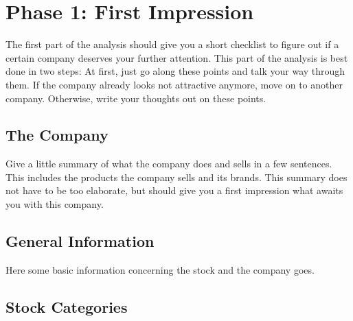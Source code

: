 \section{Phase 1: First Impression}

The first part of the analysis should give you a short checklist to figure out if a certain
company deserves your further attention. This part of the analysis is best done in
two steps: At first, just go along these points and talk your way through them. If the
company already looks not attractive anymore, move on to another company. Otherwise,
write your thoughts out on these points.

\subsection{The Company}

Give a little summary of what the company does and sells in a few sentences. This
includes the products the company sells and its brands. This summary does not have
to be too elaborate, but should give you a first impression what awaits you with this
company.

\subsection{General Information}

Here some basic information concerning the stock and the company goes.

\subsection{Stock Categories}

